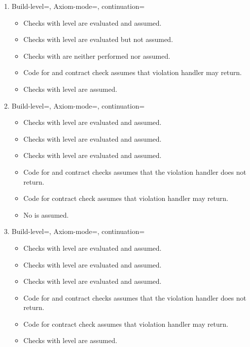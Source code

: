 \begin{enumerate}
\item Build-level=, Axiom-mode=, continuation=
\begin{itemize}
  \item Checks with  level are evaluated and assumed.
  \item Checks with  level are evaluated but not assumed.
  \item Checks with  are neither performed nor assumed.
  \item Code for  and  contract check assumes 
	  that violation handler may return.
  \item Checks with  level are assumed.
\end{itemize}

\item Build-level=, Axiom-mode=, continuation=
\begin{itemize}
  \item Checks with  level are evaluated and assumed.
  \item Checks with  level are evaluated and assumed.
  \item Checks with  level are evaluated and assumed.
  \item Code for  and  contract checks 
	  assumes that the violation handler does not return.
  \item Code for  contract check assumes that violation handler
	  may return.
  \item No  is assumed.
\end{itemize}

\item Build-level=, Axiom-mode=, continuation=
\begin{itemize}
  \item Checks with  level are evaluated and assumed.
  \item Checks with  level are evaluated and assumed.
  \item Checks with  level are evaluated and assumed.
  \item Code for  and  contract checks 
	  assumes that the violation handler does not return.
  \item Code for  contract check assumes that violation handler
	  may return.
  \item Checks with  level are assumed.
\end{itemize}


\end{enumerate}

